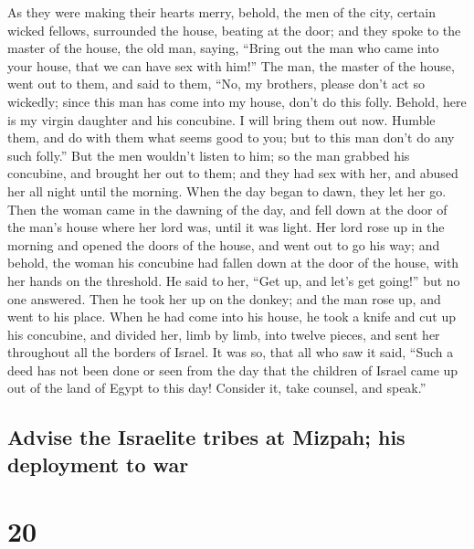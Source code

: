  As they were making their hearts merry, behold, the men
of the city, certain wicked fellows, surrounded the house, beating at
the door; and they spoke to the master of the house, the old man,
saying, ``Bring out the man who came into your house, that we can have
sex with him!''  The man, the master of the house, went
out to them, and said to them, ``No, my brothers, please don't act so
wickedly; since this man has come into my house, don't do this folly.
 Behold, here is my virgin daughter and his concubine. I
will bring them out now. Humble them, and do with them what seems good
to you; but to this man don't do any such folly.''  But
the men wouldn't listen to him; so the man grabbed his concubine, and
brought her out to them; and they had sex with her, and abused her all
night until the morning. When the day began to dawn, they let her go.
 Then the woman came in the dawning of the day, and fell
down at the door of the man's house where her lord was, until it was
light.  Her lord rose up in the morning and opened the
doors of the house, and went out to go his way; and behold, the woman
his concubine had fallen down at the door of the house, with her hands
on the threshold.  He said to her, ``Get up, and let's
get going!'' but no one answered. Then he took her up on the donkey; and
the man rose up, and went to his place.  When he had come
into his house, he took a knife and cut up his concubine, and divided
her, limb by limb, into twelve pieces, and sent her throughout all the
borders of Israel.  It was so, that all who saw it said,
``Such a deed has not been done or seen from the day that the children
of Israel came up out of the land of Egypt to this day! Consider it,
take counsel, and speak.''

\hypertarget{advise-the-israelite-tribes-at-mizpah-his-deployment-to-war}{%
\subsection{Advise the Israelite tribes at Mizpah; his deployment to
war}\label{advise-the-israelite-tribes-at-mizpah-his-deployment-to-war}}

\hypertarget{section-19}{%
\section{20}\label{section-19}}

